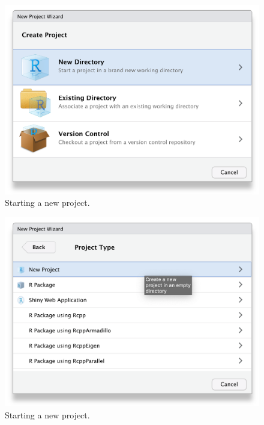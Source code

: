 \documentclass[
  oneside]{book}
\begin{document}
\begin{figure}

{\centering \includegraphics[width=1\linewidth]{images/repro/new_proj_1} 

}

\caption{Starting a new project.}\label{fig:unnamed-chunk-2-1}
\end{figure}
\begin{figure}

{\centering \includegraphics[width=1\linewidth]{images/repro/new_proj_2} 

}

\caption{Starting a new project.}\label{fig:unnamed-chunk-2-2}
\end{figure}
\end{document}
